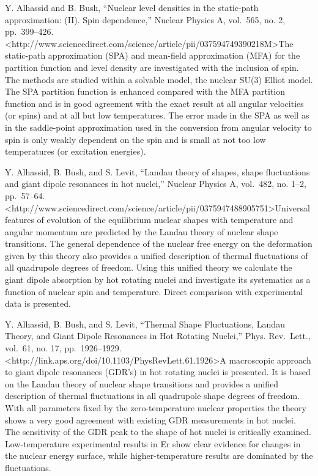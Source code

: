 \documentclass[]{article}
\begin{document}
Y. Alhassid and B. Bush, ``Nuclear level densities in the static-path
approximation: (II). Spin dependence,'' Nuclear Physics A, vol.~565, no.
2, pp.~399--426.
\textless{}http://www.sciencedirect.com/science/article/pii/037594749390218M\textgreater{}The
static-path approximation (SPA) and mean-field approximation (MFA) for
the partition function and level density are investigated with the
inclusion of spin. The methods are studied within a solvable model, the
nuclear SU(3) Elliot model. The SPA partition function is enhanced
compared with the MFA partition function and is in good agreement with
the exact result at all angular velocities (or spins) and at all but low
temperatures. The error made in the SPA as well as in the saddle-point
approximation used in the conversion from angular velocity to spin is
only weakly dependent on the spin and is small at not too low
temperatures (or excitation energies).

Y. Alhassid, B. Bush, and S. Levit, ``Landau theory of shapes, shape
fluctuations and giant dipole resonances in hot nuclei,'' Nuclear
Physics A, vol.~482, no. 1--2, pp.~57--64.
\textless{}http://www.sciencedirect.com/science/article/pii/0375947488905751\textgreater{}Universal
features of evolution of the equilibrium nuclear shapes with temperature
and angular momentum are predicted by the Landau theory of nuclear shape
transitions. The general dependence of the nuclear free energy on the
deformation given by this theory also provides a unified description of
thermal fluctuations of all quadrupole degrees of freedom. Using this
unified theory we calculate the giant dipole absorption by hot rotating
nuclei and investigate its systematics as a function of nuclear spin and
temperature. Direct comparison with experimental data is presented.

Y. Alhassid, B. Bush, and S. Levit, ``Thermal Shape Fluctuations, Landau
Theory, and Giant Dipole Resonances in Hot Rotating Nuclei,'' Phys.
Rev.~Lett., vol.~61, no. 17, pp.~1926--1929.
\textless{}http://link.aps.org/doi/10.1103/PhysRevLett.61.1926\textgreater{}A
macroscopic approach to giant dipole resonances (GDR's) in hot rotating
nuclei is presented. It is based on the Landau theory of nuclear shape
transitions and provides a unified description of thermal fluctuations
in all quadrupole shape degrees of freedom. With all parameters fixed by
the zero-temperature nuclear properties the theory shows a very good
agreement with existing GDR measurements in hot nuclei. The sensitivity
of the GDR peak to the shape of hot nuclei is critically examined.
Low-temperature experimental results in Er show clear evidence for
changes in the nuclear energy surface, while higher-temperature results
are dominated by the fluctuations.
\end{document}
